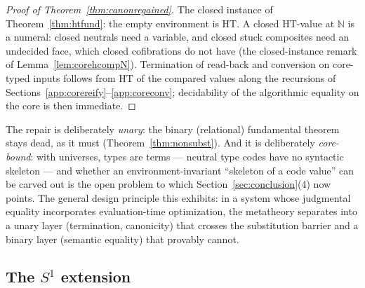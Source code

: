 \documentclass{lmcs}
\begin{document}
\begin{proof}[Proof of Theorem~\ref{thm:canonregained}]
  The closed instance of Theorem~\ref{thm:htfund}: the empty
  environment is $\mathrm{HT}$.  A closed $\mathrm{HT}$-value at
  $\mathbb{N}$ is a numeral: closed neutrals need a variable, and
  closed stuck composites need an undecided face, which closed
  cofibrations do not have (the closed-instance remark of
  Lemma~\ref{lem:corehcompN}).  Termination of read-back and
  conversion on core-typed inputs follows from $\mathrm{HT}$ of the
  compared values along the recursions of
  Sections~\ref{app:corereify}--\ref{app:coreconv}; decidability of
  the algorithmic equality on the core is then immediate.
\end{proof}

\begin{rem}
  The repair is deliberately \emph{unary}: the binary (relational)
  fundamental theorem stays dead, as it must
  (Theorem~\ref{thm:nonsubst}).  And it is deliberately
  \emph{core-bound}: with universes, types are terms --- neutral
  type codes have no syntactic skeleton --- and whether an
  environment-invariant ``skeleton of a code value'' can be carved
  out is the open problem to which
  Section~\ref{sec:conclusion}(4) now points.  The general design
  principle this exhibits: in a system whose judgmental equality
  incorporates evaluation-time optimization, the metatheory
  separates into a unary layer (termination, canonicity) that
  crosses the substitution barrier and a binary layer (semantic
  equality) that provably cannot.
\end{rem}

\subsection{The $S^1$ extension}
\label{app:s1ext}
\end{document}
